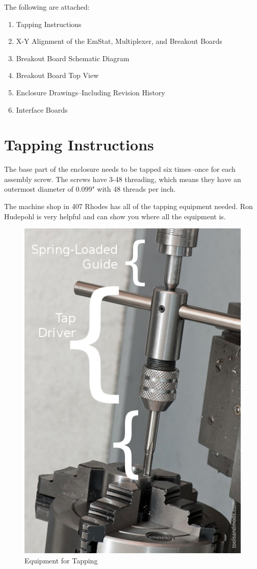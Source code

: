\documentclass[DIV=calc, paper=letterpaper, fontsize=11pt, twocolumn]{scrartcl}	 %
\begin{document}
The following are attached:
\begin{enumerate}
\item Tapping Instructions
\label{tapping-appendix}
\item X-Y Alignment of the EmStat, Multiplexer, and Breakout Boards
\label{x-y-coordinates-appendix}
\item Breakout Board Schematic Diagram
\label{breakout-board-schematic}
\item Breakout Board Top View
\label{breakout-board-top-view}
\item Enclosure Drawings--Including Revision History
\label{enclosure-drawing-appendix}
\item Interface Boards
\label{interface-boards-appendix}
\end{enumerate}


\section{Tapping Instructions}

The base part of the enclosure needs to be tapped six times--once for each assembly screw.
The screws have 3-48 threading,
which means they have an outermost diameter of 0.099" with 48 threads per inch.

The machine shop in 407 Rhodes has all of the tapping equipment needed.
Ron Hudepohl is very helpful and can show you where all the equipment is.

\begin{figure}[ht]
\centering
\includegraphics[width=0.7\columnwidth]{tapping-equipment}
\caption{Equipment for Tapping}
\end{figure}
\end{document}
